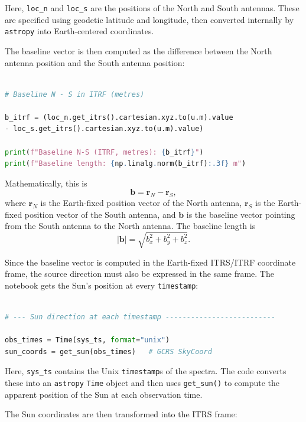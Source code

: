 \documentclass[12pt]{extarticle}
\begin{document}
Here, \texttt{loc\_n} and \texttt{loc\_s} are the positions of the North and South antennas. These are specified using geodetic latitude and longitude, then converted internally by \texttt{astropy} into Earth-centered coordinates.

The baseline vector is then computed as the difference between the North antenna position and the South antenna position:

\begin{lstlisting}[language=Python]

# Baseline N - S in ITRF (metres)

b_itrf = (loc_n.get_itrs().cartesian.xyz.to(u.m).value
- loc_s.get_itrs().cartesian.xyz.to(u.m).value)

print(f"Baseline N-S (ITRF, metres): {b_itrf}")
print(f"Baseline length: {np.linalg.norm(b_itrf):.3f} m")
\end{lstlisting}

Mathematically, this is
\begin{equation}
\mathbf{b} = \mathbf{r}_{N} - \mathbf{r}_{S},
\end{equation}
where $\mathbf{r}_{N}$ is the Earth-fixed position vector of the North antenna, $\mathbf{r}_{S}$ is the Earth-fixed position vector of the South antenna, and $\mathbf{b}$ is the baseline vector pointing from the South antenna to the North antenna. The baseline length is
\begin{equation}
|\mathbf{b}| = \sqrt{b_x^2 + b_y^2 + b_z^2}.
\end{equation}

Since the baseline vector is computed in the Earth-fixed ITRS/ITRF coordinate frame, the source direction must also be expressed in the same frame. The notebook gets the Sun's position at every \texttt{timestamp}:

\begin{lstlisting}[language=Python]

# --- Sun direction at each timestamp --------------------------

obs_times = Time(sys_ts, format="unix")
sun_coords = get_sun(obs_times)   # GCRS SkyCoord
\end{lstlisting}

Here, \texttt{sys\_ts} contains the Unix \texttt{timestamp}s of the spectra. The code converts these into an \texttt{astropy} \texttt{Time} object and then uses \texttt{get\_sun()} to compute the apparent position of the Sun at each observation time.

The Sun coordinates are then transformed into the ITRS frame:
\end{document}
